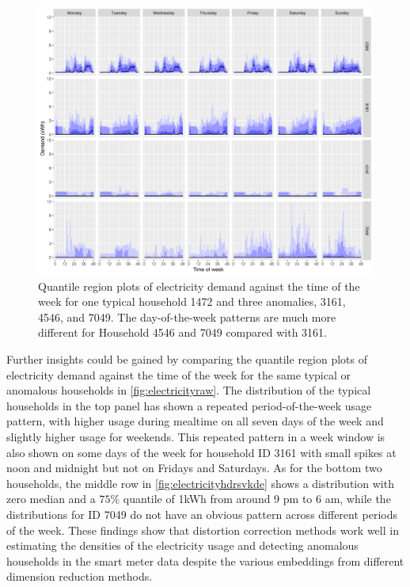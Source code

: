\documentclass[
]{article}
\begin{document}
\begin{figure}

{\centering \includegraphics[width=0.95\linewidth]{figures/Electricity_2d_plot_hdrbox_7dow_4id_1typical_3anomalous} 

}

\caption{Quantile region plots of electricity demand against the time of the week for one typical household 1472 and three anomalies, 3161, 4546, and 7049. The day-of-the-week patterns are much more different for Household 4546 and 7049 compared with 3161.}\label{fig:electricityhdrsvkde}
\end{figure}

Further insights could be gained by comparing the quantile region plots
of electricity demand against the time of the week for the same typical
or anomalous households in \autoref{fig:electricityraw}. The
distribution of the typical households in the top panel has shown a
repeated period-of-the-week usage pattern, with higher usage during
mealtime on all seven days of the week and slightly higher usage for
weekends. This repeated pattern in a week window is also shown on some
days of the week for household ID 3161 with small spikes at noon and
midnight but not on Fridays and Saturdays. As for the bottom two
households, the middle row in \autoref{fig:electricityhdrsvkde} shows a
distribution with zero median and a \(75\%\) quantile of 1kWh from
around 9 pm to 6 am, while the distributions for ID 7049 do not have an
obvious pattern across different periods of the week. These findings
show that distortion correction methods work well in estimating the
densities of the electricity usage and detecting anomalous households in
the smart meter data despite the various embeddings from different
dimension reduction methods.
\end{document}
